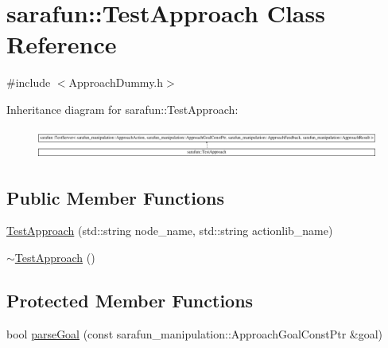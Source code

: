 \hypertarget{classsarafun_1_1TestApproach}{\section{sarafun\-:\-:Test\-Approach Class Reference}
\label{classsarafun_1_1TestApproach}
}


{\ttfamily \#include $<$Approach\-Dummy.\-h$>$}

Inheritance diagram for sarafun\-:\-:Test\-Approach\-:\begin{figure}[H]
\begin{center}
\leavevmode
\includegraphics[height=1.009009cm]{classsarafun_1_1TestApproach}
\end{center}
\end{figure}
\subsection*{Public Member Functions}
\begin{DoxyCompactItemize}
\item 
\hyperlink{classsarafun_1_1TestApproach_aebd82243594c941ecceb4f73b44d4139}{Test\-Approach} (std\-::string node\-\_\-name, std\-::string actionlib\-\_\-name)
\item 
\hyperlink{classsarafun_1_1TestApproach_a5a261f65818ad6ee669b75573811c31f}{$\sim$\-Test\-Approach} ()
\end{DoxyCompactItemize}
\subsection*{Protected Member Functions}
\begin{DoxyCompactItemize}
\item 
bool \hyperlink{classsarafun_1_1TestApproach_a28514fa2ab41956d1cd6622ffecdbd56}{parse\-Goal} (const sarafun\-\_\-manipulation\-::\-Approach\-Goal\-Const\-Ptr \&goal)
\end{DoxyCompactItemize}


